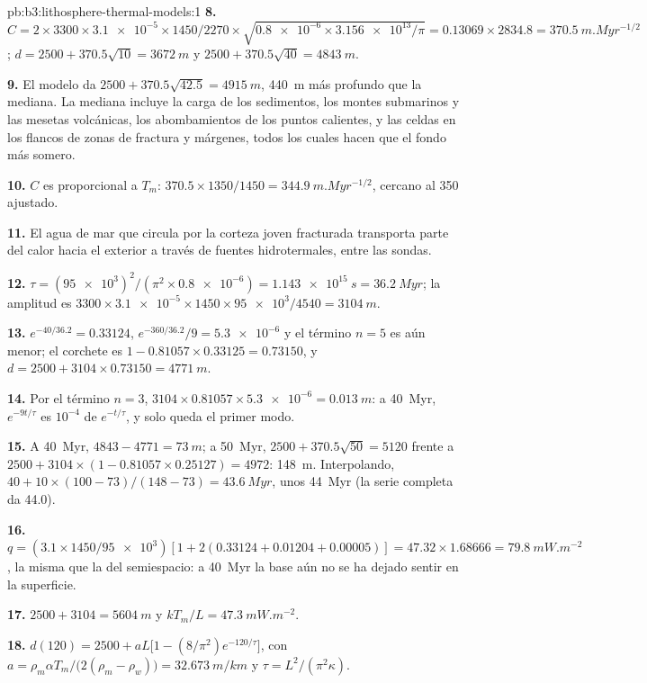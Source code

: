 \begin{solution}{pb:b3:lithosphere-thermal-models:1}
\textbf{8.} $C = 2\times3300\times\num{3.1e-5}\times1450/2270\times
\sqrt{\num{0.8e-6}\times\num{3.156e13}/\pi} = 0.13069\times2834.8 =
\qty{370.5}{m.Myr^{-1/2}}$; $d = 2500 + 370.5\sqrt{10} = \qty{3672}{m}$ y
$2500 + 370.5\sqrt{40} = \qty{4843}{m}$.

\textbf{9.} El modelo da $2500 + 370.5\sqrt{42.5} = \qty{4915}{m}$,
\qty{440}{m} más profundo que la mediana. La mediana incluye la carga de los
sedimentos, los montes submarinos y las mesetas volcánicas, los abombamientos de los puntos calientes, y
las celdas en los flancos de zonas de fractura y márgenes, todos los cuales hacen que el fondo
más somero.

\textbf{10.} $C$ es proporcional a $T_m$: $370.5\times1350/1450 =
\qty{344.9}{m.Myr^{-1/2}}$, cercano al 350 ajustado.

\textbf{11.} El agua de mar que circula por la corteza joven fracturada transporta
parte del calor hacia el exterior a través de fuentes hidrotermales, entre las sondas.

\textbf{12.} $\tau = (\num{95e3})^2/(\pi^2\times\num{0.8e-6}) =
\qty{1.143e15}{s} = \qty{36.2}{Myr}$; la amplitud es $3300\times
\num{3.1e-5}\times1450\times\num{95e3}/4540 = \qty{3104}{m}$.

\textbf{13.} $e^{-40/36.2} = 0.33124$, $e^{-360/36.2}/9 = \num{5.3e-6}$ y el
término $n = 5$ es aún menor; el corchete es $1 - 0.81057\times0.33125 =
0.73150$, y $d = 2500 + 3104\times0.73150 = \qty{4771}{m}$.

\textbf{14.} Por el término $n = 3$, $3104\times0.81057\times\num{5.3e-6} =
\qty{0.013}{m}$: a \qty{40}{Myr}, $e^{-9t/\tau}$ es $10^{-4}$ de
$e^{-t/\tau}$, y solo queda el primer modo.

\textbf{15.} A \qty{40}{Myr}, $4843 - 4771 = \qty{73}{m}$; a
\qty{50}{Myr}, $2500 + 370.5\sqrt{50} = 5120$ frente a $2500 + 3104\times(1 -
0.81057\times0.25127) = 4972$: \qty{148}{m}. Interpolando, $40 + 10\times
(100 - 73)/(148 - 73) = \qty{43.6}{Myr}$, unos \qty{44}{Myr} (la serie completa
da 44.0).

\textbf{16.} $q = (3.1\times1450/\num{95e3})[1 + 2(0.33124 + 0.01204 +
0.00005)] = 47.32\times1.68666 = \qty{79.8}{mW.m^{-2}}$, la misma que la del
semiespacio: a \qty{40}{Myr} la base aún no se ha dejado sentir en la
superficie.

\textbf{17.} $2500 + 3104 = \qty{5604}{m}$ y $kT_m/L = \qty{47.3}{mW.m^{-2}}$.

\textbf{18.} $d(120) = 2500 + aL\bigl[1 - (8/\pi^2)e^{-120/\tau}\bigr]$, con
$a = \rho_m\alpha T_m/\bigl(2(\rho_m - \rho_w)\bigr) = \qty{32.673}{m/km}$ y
$\tau = L^2/(\pi^2\kappa)$.


\end{solution}
